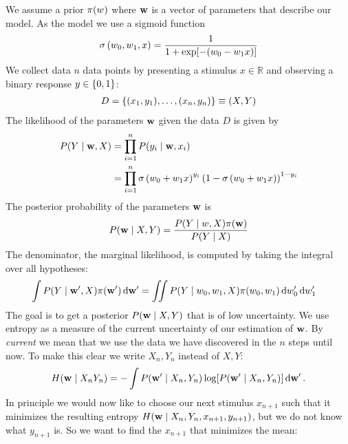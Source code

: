 
We assume a prior ${\pi(w)}$ where ${\bf w}$ is a vector of parameters that describe our model.
As the model we use a sigmoid function
\begin{align}
	{\sigma \left(w_0, w_1, x\right)} = \frac{1}{1 + \exp[-(w_0 - w_1 x)]}
\end{align}
We collect data $n$ data points by presenting a stimulus $x \in \mathbb{R}$ and observing a binary response $y \in \left\{ 0, 1 \right\}$:
\begin{align}
	 D = \left\{ (x_1, y_1), \dots, (x_n, y_n) \right\} \equiv (X, Y)
\end{align}
The likelihood of the parameters ${\bf w}$ given the data $D$ is given by
\begin{align}
	{P(Y \mid {\bf w}, X)}
	&= \prod_{i=1}^n {P(y_i \mid {\bf w}, x_i)} \\
	&= \prod_{i=1}^n {\sigma \left(w_0 + w_1 x\right)}^{y_i}
		\left( 1 - {\sigma \left(w_0 + w_1 x\right)} \right)^{1-y_i}
\end{align}
The posterior probability of the parameters ${\bf w}$ is
\begin{align}
	{P({\bf w} \mid X, Y)} = \frac{{P(Y \mid w, X)} {\pi({\bf w})}}{{P(Y \mid X)}}
\end{align}
The denominator, \ie the marginal likelihood, is computed by taking the integral over all hypotheses:
\begin{align}
	\int {P(Y \mid {\bf w}', X)} {\pi({\bf w}')} \,\mathrm{d} {\bf w}'
	&= \iint {P(Y \mid w_0, w_1, X)} {\pi(w_0, w_1)} \,\mathrm{d} w_0' \,\mathrm{d} w_1'
\end{align}
The goal is to get a posterior ${P({\bf w} \mid X, Y)}$ that is of low uncertainty. We use entropy as a measure of the current uncertainty of our estimation of ${\bf w}$. By \emph{current} we mean that we use the data we have discovered in the $n$ steps until now. To make this clear we write $X_n, Y_n$ instead of $X, Y$:
\begin{align}
	H({\bf w} \mid X_n Y_n) = - \int {P({\bf w}' \mid X_n, Y_n)} \log[{P({\bf w}' \mid X_n, Y_n)}] \,\mathrm{d} {\bf w}' \,.
\end{align}
In principle we would now like to choose our next stimulus $x_{n+1}$ such that it minimizes the resulting entropy $H({\bf w} \mid X_n, Y_n, x_{n+1}, y_{n+1})$, but we do not know what $y_{n+1}$ is. So we want to find the $x_{n+1}$ that minimizes the mean:
